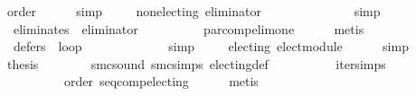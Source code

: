 \begin{isabellebody}
\ order\isanewline
\ \ \ \ \isamarkupfalse%
\ simp\isanewline
\isanewline
\ \ \isamarkupfalse%
\ {}{}{\isacharcolon}{\kern0pt}\ {\isachardoublequoteopen}non{\isacharunderscore}{\kern0pt}electing\ {\isacharquery}{\kern0pt}eliminator{\isachardoublequoteclose}\isanewline
\ \ \ \ \isamarkupfalse%
\ {}{}{}\ {}{}{}\ {}{}{}\isanewline
\ \ \ \ \isamarkupfalse%
\ simp\isanewline
\ \ \isamarkupfalse%
\ {}{}{\isacharcolon}{\kern0pt}\ {\isachardoublequoteopen}eliminates\ {}\ {\isacharquery}{\kern0pt}eliminator{\isachardoublequoteclose}\isanewline
\ \ \ \ \isamarkupfalse%
\ {}{}{}\ {}{}{}\ {}{}{}\ {}{}{}\ par{\isacharunderscore}{\kern0pt}comp{\isacharunderscore}{\kern0pt}elim{\isacharunderscore}{\kern0pt}one\isanewline
\ \ \ \ \isamarkupfalse%
\ metis\isanewline
\isanewline
\ \ \isamarkupfalse%
\ {}{\isacharcolon}{\kern0pt}\ {\isachardoublequoteopen}defers\ {}\ {\isacharquery}{\kern0pt}loop{\isachardoublequoteclose}\isanewline
\ \ \ \ \isamarkupfalse%
\ {}{}\ {}{}\isanewline
\ \ \ \ \isamarkupfalse%
\ simp\isanewline
\ \ \isamarkupfalse%
\ {}{\isacharcolon}{\kern0pt}\ {\isachardoublequoteopen}electing\ elect{\isacharunderscore}{\kern0pt}module{\isachardoublequoteclose}\isanewline
\ \ \ \ \isamarkupfalse%
\ simp\isanewline
\isanewline
\ \ \isamarkupfalse%
\ {\isacharquery}{\kern0pt}thesis\isanewline
\ \ \ \ \isamarkupfalse%
\ {}\ {}\ smc{\isacharunderscore}{\kern0pt}sound\ smc{\isachardot}{\kern0pt}simps\ electing{\isacharunderscore}{\kern0pt}def\isanewline
\ \ \ \ \ \ \ \ \ \ iter{\isachardot}{\kern0pt}simps\isanewline
\ \ \ \ \ \ \ \ \ \ order\ seq{\isacharunderscore}{\kern0pt}comp{\isacharunderscore}{\kern0pt}electing\isanewline
\ \ \ \ \isamarkupfalse%
\ metis\isanewline
{}\isamarkupfalse%
%
\endisatagproof
{\isafoldproof}%
%
\isadelimproof
%
\endisadelimproof
%
\isadelimdocument
%
\endisadelimdocument
%
\isatagdocument
%
\isamarkuptrue%
%
\endisatagdocument

\end{isabellebody}
